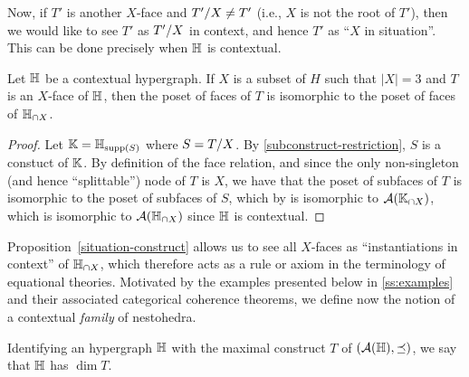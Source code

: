 Now, if $T'$ is another $X$-face and $T'/X\neq T'$ (i.e., $X$ is not the root of $T'$), then we would like to see  $T'$ as $T'/X$ in context, and hence $T'$ as ``$X$ in situation''.  
This can be done precisely when ${\mathbb H}$ is contextual.



\begin{proposition} \label{situation-construct}
Let ${\mathbb H}$ be a contextual hypergraph.
If $X$ is a subset of $H$ such that $|X|=3$ and $T$ is an $X$-face of ${\mathbb H}$, then the poset of faces of $T$ is isomorphic to the poset of faces of ${\mathbb H}_{\cap X}$.
\end{proposition}

\begin{proof} 
  Let ${\mathbb K}={\mathbb H}_{\operatorname{supp}(S)}$ where $S=T/X$. 
  By \cref{subconstruct-restriction}, $S$ is a constuct of ${\mathbb K}$. By definition of the face relation, and since the only non-singleton (and hence ``splittable'') node of $T$ is $X$, we have that the poset of subfaces of $T$ is isomorphic to the poset of subfaces of $S$, which by  is isomorphic to ${\cal A}({\mathbb K}_{\cap X})$, which is isomorphic to ${\cal A}({\mathbb H}_{\cap X})$ since ${\mathbb H}$ is contextual.
\end{proof}

Proposition~\ref{situation-construct} allows us to see all $X$-faces as ``instantiations in context'' of ${\mathbb H}_{\cap X}$, which therefore acts  as a rule or axiom in the terminology of equational theories.
Motivated by the examples presented below in \cref{ss:examples} and their associated categorical coherence theorems, we define now the notion of a contextual \emph{family} of nestohedra.

Identifying an hypergraph ${\mathbb H}$ with the maximal construct $T$ of $({\cal A}({\mathbb H}),\preceq)$, we say that ${\mathbb H}$ has  $\dim T$.

